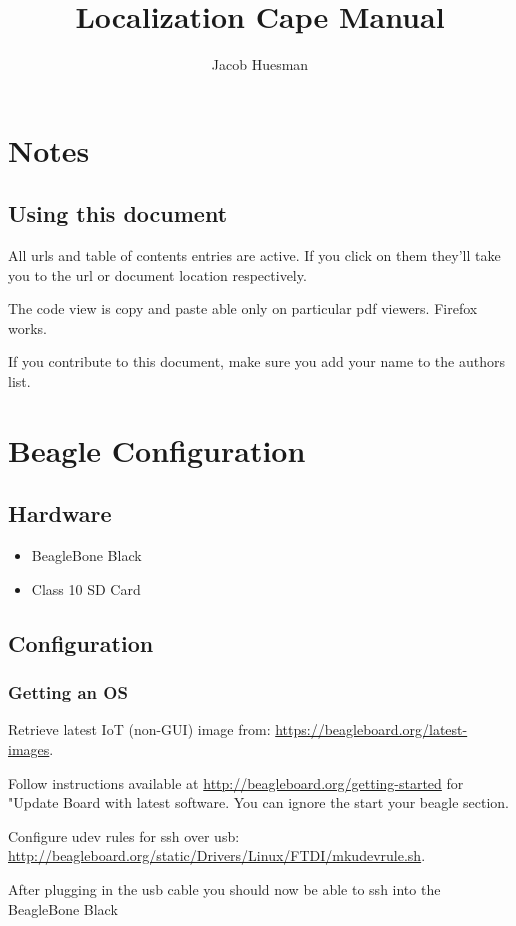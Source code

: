\documentclass[]{book}
\title{Localization Cape Manual}
\author{Jacob Huesman}
\begin{document}
{
	\let\cleardoublepage\clearpage
	\maketitle
	\tableofcontents
}

\chapter{Notes}
\section{Using this document}
All urls and table of contents entries are active. If you click on them they'll take you to the url or document location respectively.

The code view is copy and paste able only on particular pdf viewers. Firefox works.

If you contribute to this document, make sure you add your name to the authors list.

\chapter{Beagle Configuration}
\section{Hardware}
\begin{itemize}
	\item BeagleBone Black
	\item Class 10 SD Card
\end{itemize}

\section{Configuration}
\subsection{Getting an OS}
Retrieve latest IoT (non-GUI) image from: \url{https://beagleboard.org/latest-images}.

Follow instructions available at \url{http://beagleboard.org/getting-started} for "Update Board with latest software. You can ignore the start your beagle section.

Configure udev rules for ssh over usb: \url{http://beagleboard.org/static/Drivers/Linux/FTDI/mkudevrule.sh}.

After plugging in the usb cable you should now be able to ssh into the BeagleBone Black
\end{document}
